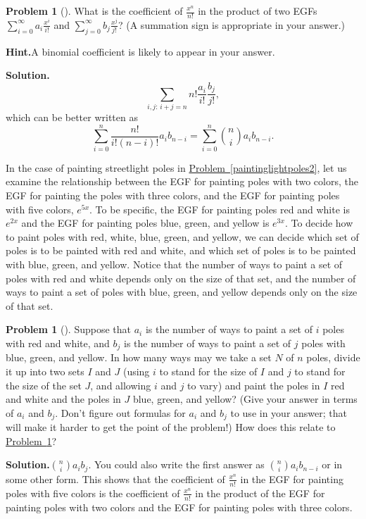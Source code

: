 \documentclass[10pt,]{book}
\theoremstyle{plain}
\theoremstyle{definition}
\newtheorem{activity}[project]{Problem}
\theoremstyle{definition}
\numberwithin{equation}{chapter}
\begin{document}
\begin{activity}[]\label{exponentialpp1}
What is the coefficient of \(\frac{x^n}{n!}\) in the product of two EGFs \(\sum_{i=0}^\infty a_i\frac{x^i}{i!}\) and \(\sum_{j=0}^\infty
b_j\frac{x^j}{j!}\)? (A summation sign is appropriate in your answer.)%
\par\medskip\noindent%
\textbf{Hint.}\quad A binomial coefficient is likely to appear in your answer.%
\par\medskip\noindent%
\textbf{Solution.}\quad %
\begin{equation*}
\sum_{i,j\mbox{:\ }
i+j=n} n!\frac{a_i}{i!}\frac{b_j}{j!},
\end{equation*}
which can be better written as%
\begin{equation*}
\sum_{i=0}^n\frac{n!}{i!(n-i)!} a_i
b_{n-i}=\sum_{i=0}^n\binom{n}{i} a_i b_{n-i}.
\end{equation*}
%
\end{activity}
 In the case of painting streetlight poles in \hyperref[paintinglightpoles2]{Problem~\ref{paintinglightpoles2}}, let us examine the relationship between the EGF for painting poles with two colors, the EGF for painting the poles with three colors, and the EGF for painting poles with five colors, \(e^{5x}\). To be specific, the EGF for painting poles red and white is \(e^{2x}\) and the EGF for painting poles blue, green, and yellow is \(e^{3x}\). To decide how to paint poles with red, white, blue, green, and yellow, we can decide  which set of poles is to be painted with red and white, and which set of poles is to be painted with blue, green, and yellow. Notice that the number of ways to paint a set of poles with red and white depends only on the size of that set, and the number of ways to paint a set of poles with blue, green, and yellow depends only on the size of that set.%
\begin{activity}[]\label{exponentialpp2}
Suppose that \(a_i\) is the number of ways to paint a set of \(i\) poles with red and white, and \(b_j\) is the number of ways to paint a set of \(j\) poles with blue, green, and yellow. In how many ways may we take a set \(N\) of \(n\) poles, divide it up into two sets \(I\) and \(J\) (using \(i\) to stand for the size of \(I\) and \(j\) to stand for the size of the set \(J\), and allowing \(i\) and \(j\) to vary) and paint the poles in \(I\) red and white and the poles in \(J\) blue, green, and yellow? (Give your answer in terms of \(a_i\) and \(b_j\).  Don't figure out formulas for  \(a_i\) and \(b_j\) to use in your answer; that will make it harder to get the point of the problem!) How does this relate to \hyperref[exponentialpp1]{Problem~\ref{exponentialpp1}}?%
\par\medskip\noindent%
\textbf{Solution.}\quad \(\binom{n}{i}a_ib_j\). You could also write the first answer as \(\binom{n}{i}a_ib_{n-i}\) or in some other form.  This shows that the coefficient of \(\frac{x^n}{n!}\) in the EGF for painting poles with five colors is the coefficient of  \(\frac{x^n}{n!}\) in the product of the EGF for painting poles with two colors and the EGF for painting poles with three colors.%
\end{activity}
\end{document}
